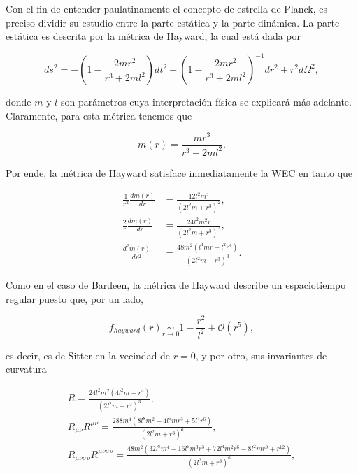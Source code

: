 \documentclass[16pt,a4paper]{article}
\numberwithin{equation}{section}
\theoremstyle{definition}
\begin{document}
Con el fin de entender paulatinamente el concepto de estrella de Planck, es preciso dividir su estudio entre la parte estática y la parte dinámica. La parte estática es descrita por la métrica de Hayward, la cual está dada por 

\begin{equation}
\label{hayward metric}
ds^2 = -\left( 1 - \frac{2mr^2}{r^3 + 2ml^2} \right) dt^2 + \left( 1 - \frac{2mr^2}{r^3 + 2ml^2} \right)^{-1} dr^2 + r^2d\Omega ^2,
\end{equation}

donde $m$ y $l$ son parámetros cuya interpretación física se explicará más adelante. Claramente, para esta métrica tenemos que

\begin{equation}
\label{hayward mass}
m(r) =  \frac{mr^3}{r^3 + 2ml^2}.
\end{equation}

Por ende, la métrica de Hayward satisface inmediatamente la WEC en tanto que 

\begin{equation}
\begin{aligned}
\frac{1}{r^2}\frac{dm(r)}{dr} &= \frac{12 l^2 m^2}{\left(2 l^2 m+r^3\right)^2},\\
\frac{2}{r}\frac{dm(r)}{dr} &= \frac{24 l^2 m^2 r}{\left(2 l^2 m+r^3\right)^2},\\
\frac{d^2m(r)}{dr^2} &= \frac{48 m^2 \left(l^4 m r-l^2 r^4\right)}{\left(2 l^2 m+r^3\right)^3}.
\end{aligned}
\end{equation}

Como en el caso de Bardeen, la métrica de Hayward describe un espaciotiempo regular puesto que, por un lado, 

\begin{equation}
f_{hayward}(r) \underset{r \to 0}{\sim} 1 - \frac{r^2}{l^2} + \mathcal{O}(r^5),
\end{equation}

es decir, es de Sitter en la vecindad de $r =0$, y por otro, sus invariantes de curvatura

\begin{equation}
\label{hayward scalars}
\begin{gathered}
R = \frac{24 l^2 m^2 \left(4 l^2 m-r^3\right)}{\left(2 l^2 m+r^3\right)^3},\\
R_{\mu \nu}R^{\mu \nu} = \frac{288 m^4 \left(8 l^8 m^2-4 l^6 m r^3+5 l^4 r^6\right)}{\left(2 l^2 m+r^3\right)^6},\\
R_{\mu \nu \sigma \rho}R^{\mu \nu \sigma \rho} = \frac{48 m^2 \left(32 l^8 m^4-16 l^6 m^3 r^3+72 l^4 m^2 r^6-8 l^2 m r^9+r^{12}\right)}{\left(2 l^2 m+r^3\right)^6},
\end{gathered}
\end{equation}
\end{document}
